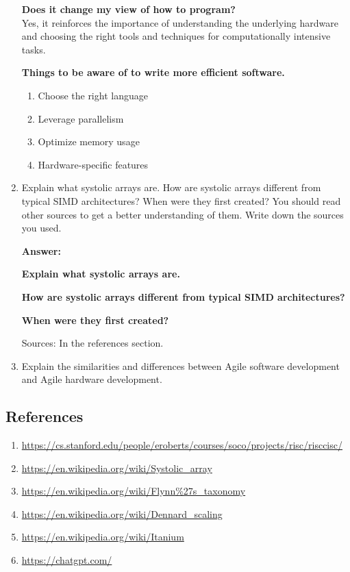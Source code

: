 \documentclass[a4paper,12pt]{article}
\begin{document}
\begin{enumerate}
    \textbf{Does it change my view of how to program?}\\
    Yes, it reinforces the importance of understanding the underlying hardware and choosing the right tools and techniques for computationally intensive tasks.

    \textbf{Things to be aware of to write more efficient software.}
    \begin{enumerate}
        \item Choose the right language
        \item Leverage parallelism
        \item Optimize memory usage
        \item Hardware-specific features
    \end{enumerate}

    \item Explain what systolic arrays are. How are systolic arrays different from typical SIMD architectures? When were they first created? You should read other sources to get a better understanding of them. Write down the sources you used.

    \textbf{Answer:}

    \textbf{Explain what systolic arrays are.}

    \textbf{How are systolic arrays different from typical SIMD architectures?}

    \textbf{When were they first created? }

    Sources: In the references section.

    \item Explain the similarities and differences between Agile software development and Agile hardware development.
\end{enumerate}

\subsection*{References}

\begin{enumerate}
    \item \url{https://cs.stanford.edu/people/eroberts/courses/soco/projects/risc/risccisc/} \sloppy
    \item \url{https://en.wikipedia.org/wiki/Systolic_array}
    \item \url{https://en.wikipedia.org/wiki/Flynn%27s_taxonomy}
    \item \url{https://en.wikipedia.org/wiki/Dennard_scaling}
    \item \url{https://en.wikipedia.org/wiki/Itanium}
    \item \url{https://chatgpt.com/}
\end{enumerate}
\end{document}
